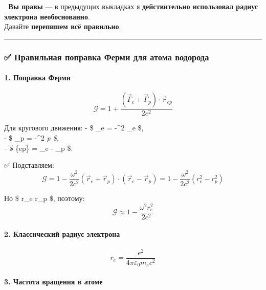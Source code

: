 \documentclass[11pt]{article}
\begin{document}
📌 \textbf{Вы правы} --- в предыдущих выкладках я \textbf{действительно
использовал радиус электрона необоснованно}.\\
Давайте \textbf{перепишем всё правильно}.

\begin{center}\rule{0.5\linewidth}{\linethickness}\end{center}

\subsubsection{✅ Правильная поправка Ферми для атома
водорода}\label{ux43fux440ux430ux432ux438ux43bux44cux43dux430ux44f-ux43fux43eux43fux440ux430ux432ux43aux430-ux444ux435ux440ux43cux438-ux434ux43bux44f-ux430ux442ux43eux43cux430-ux432ux43eux434ux43eux440ux43eux434ux430}

\paragraph{1. Поправка
Ферми}\label{ux43fux43eux43fux440ux430ux432ux43aux430-ux444ux435ux440ux43cux438}

\[
\mathcal{G} = 1 + \frac{(\vec{\Gamma}_e + \vec{\Gamma}_p) \cdot \vec{r}_{ep}}{2c^2}
\]

Для кругового движения: - \$ \vec{\Gamma}\_e = -\omega\^{}2 \_e
\$,\\
- \$ \vec{\Gamma}\_p = -\omega\^{}2 \emph{p \$,\\
- \$ }\{ep\} = \_e - \_p \$.

✅ Подставляем: \[
\mathcal{G} = 1 - \frac{\omega^2}{2c^2} (\vec{r}_e + \vec{r}_p) \cdot (\vec{r}_e - \vec{r}_p) = 1 - \frac{\omega^2}{2c^2} (r_e^2 - r_p^2)
\]

Но \$ r\_e \gg r\_p \$, поэтому: \[
\mathcal{G} \approx 1 - \frac{\omega^2 r_e^2}{2c^2}
\]

\paragraph{2. Классический радиус
электрона}\label{ux43aux43bux430ux441ux441ux438ux447ux435ux441ux43aux438ux439-ux440ux430ux434ux438ux443ux441-ux44dux43bux435ux43aux442ux440ux43eux43dux430}

\[
r_e = \frac{e^2}{4\pi\varepsilon_0 m_e c^2}
\]

\paragraph{3. Частота вращения в
атоме}\label{ux447ux430ux441ux442ux43eux442ux430-ux432ux440ux430ux449ux435ux43dux438ux44f-ux432-ux430ux442ux43eux43cux435}
\end{document}
